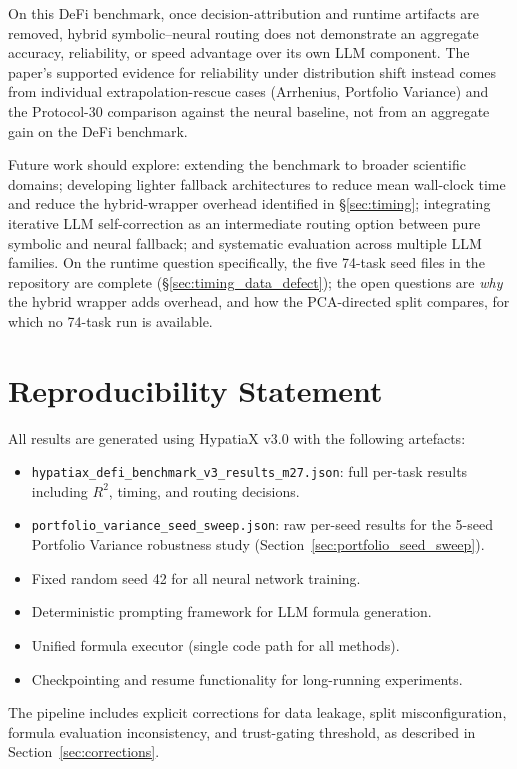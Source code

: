 \documentclass[twoside,11pt]{article}
\newcommand{\Rsq}{R^{2}}
\begin{document}
On this DeFi benchmark, once decision-attribution and runtime artifacts are
removed, hybrid symbolic--neural routing does not demonstrate an aggregate
accuracy, reliability, or speed advantage over its own LLM component. The
paper's supported evidence for reliability under distribution shift instead
comes from individual extrapolation-rescue cases (Arrhenius, Portfolio
Variance) and the Protocol-30 comparison against the neural baseline, not
from an aggregate gain on the DeFi benchmark.

Future work should explore: extending the benchmark to broader scientific domains;
developing lighter fallback architectures to reduce mean wall-clock time and
reduce the hybrid-wrapper overhead identified in
\S\ref{sec:timing};
integrating iterative LLM self-correction as an intermediate routing option between
pure symbolic and neural fallback; and systematic evaluation across multiple LLM
families. On the runtime question specifically, the five 74-task seed files in
the repository are complete (\S\ref{sec:timing_data_defect}); the open
questions are \emph{why} the hybrid wrapper adds overhead, and how the
PCA-directed split compares, for which no 74-task run is available.

\section*{Reproducibility Statement}

All results are generated using HypatiaX v3.0 with the following artefacts:
\begin{itemize}
  \item \texttt{hypatiax\_defi\_benchmark\_v3\_results\_m27.json}: full per-task
    results including $\Rsq$, timing, and routing decisions.
  \item \texttt{portfolio\_variance\_seed\_sweep.json}: raw per-seed results for
    the 5-seed Portfolio Variance robustness study (Section~\ref{sec:portfolio_seed_sweep}).
  \item Fixed random seed 42 for all neural network training.
  \item Deterministic prompting framework for LLM formula generation.
  \item Unified formula executor (single code path for all methods).
  \item Checkpointing and resume functionality for long-running experiments.
\end{itemize}
The pipeline includes explicit corrections for data leakage, split misconfiguration,
formula evaluation inconsistency, and trust-gating threshold, as described in
Section~\ref{sec:corrections}.
\end{document}
